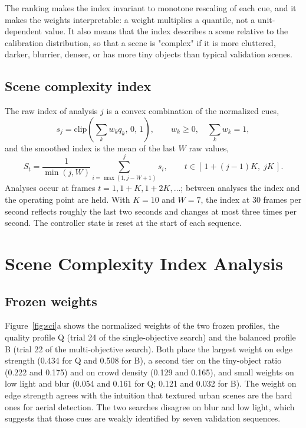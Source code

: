 \documentclass[journal]{new-aiaa}
\begin{document}
The ranking makes the index invariant to monotone rescaling of each cue, and it makes the weights interpretable: a weight multiplies a quantile, not a unit-dependent value. It also means that the index describes a scene relative to the calibration distribution, so that a scene is "complex" if it is more cluttered, darker, blurrier, denser, or has more tiny objects than typical validation scenes.

\subsection{Scene complexity index}
The raw index of analysis $j$ is a convex combination of the normalized cues,
\begin{equation}
s_j = \mathrm{clip}\left(\sum_{k} w_k q_k,\, 0,\, 1\right), \qquad w_k \ge 0,\quad \sum_k w_k = 1,
\label{eq:sci}
\end{equation}
and the smoothed index is the mean of the last $W$ raw values,
\begin{equation}
S_t = \frac{1}{\min(j,W)} \sum_{i=\max(1,j-W+1)}^{j} s_i, \qquad t \in [\,1+(j-1)K,\; jK\,].
\label{eq:smooth}
\end{equation}
Analyses occur at frames $t=1, 1+K, 1+2K, \ldots$; between analyses the index and the operating point are held. With $K=10$ and $W=7$, the index at 30 frames per second reflects roughly the last two seconds and changes at most three times per second. The controller state is reset at the start of each sequence.

\section{Scene Complexity Index Analysis}\label{sec:sci}

\subsection{Frozen weights}
Figure~\ref{fig:sci}a shows the normalized weights of the two frozen profiles, the quality profile Q (trial 24 of the single-objective search) and the balanced profile B (trial 22 of the multi-objective search). Both place the largest weight on edge strength (0.434 for Q and 0.508 for B), a second tier on the tiny-object ratio (0.222 and 0.175) and on crowd density (0.129 and 0.165), and small weights on low light and blur (0.054 and 0.161 for Q; 0.121 and 0.032 for B). The weight on edge strength agrees with the intuition that textured urban scenes are the hard ones for aerial detection. The two searches disagree on blur and low light, which suggests that those cues are weakly identified by seven validation sequences.
\end{document}
